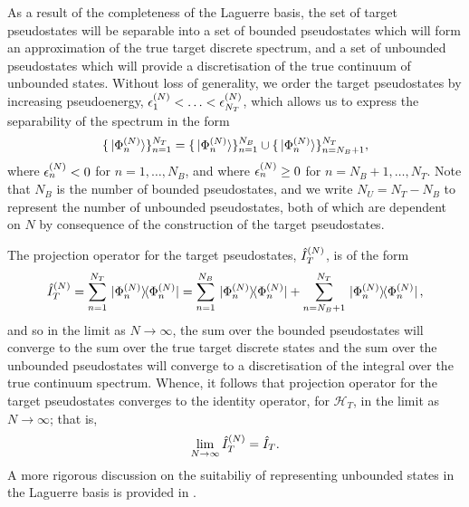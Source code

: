 \documentclass[]{article}
\begin{document}
As a result of the completeness of the Laguerre basis, the set of target
pseudostates will be separable into a set of bounded pseudostates which will
form an approximation of the true target discrete spectrum, and a set of
unbounded pseudostates which will provide a discretisation of the true continuum
of unbounded states.
Without loss of generality, we order the target pseudostates by increasing
pseudoenergy, $\epsilon_{1}^{(N)} < \dotsc < \epsilon_{N_{T}}^{(N)}$,
which allows us to express the separability of the spectrum in the form
\begin{equation}
  \label{eq:target-spectrum-separable}
  \lbrace\ket*{\Phi_{n}^{(N)}}\rbrace_{n = 1}^{N_{T}}
  =
  \lbrace\ket*{\Phi_{n}^{(N)}}\rbrace_{n = 1}^{N_{B}}
  \cup
  \lbrace\ket*{\Phi_{n}^{(N)}}\rbrace_{n = N_{B} + 1}^{N_{T}}
  ,
\end{equation}
where $\epsilon_{n}^{(N)} < 0$ for $n = 1, \dotsc, N_{B}$, and where
$\epsilon_{n}^{(N)} \geq 0$ for $n = N_{B} + 1, \dotsc, N_{T}$.
Note that $N_{B}$ is the number of bounded pseudostates, and we write
$N_{U} = N_{T} - N_{B}$ to represent the number of unbounded pseudostates, both of
which are dependent on $N$ by consequence of the construction of the target
pseudostates.

The projection operator for the target pseudostates, $\hat{I}_{T}^{(N)}$, is
of the form
\begin{equation}
  \label{eq:target-projection}
  \hat{I}_{T}^{(N)}
  =
  \sum_{n = 1}^{N_{T}}
  \ketbra*
  {\Phi_{n}^{(N)}}
  {\Phi_{n}^{(N)}}
  =
  \sum_{n = 1}^{N_{B}}
  \ketbra*
  {\Phi_{n}^{(N)}}
  {\Phi_{n}^{(N)}}
  +
  \sum_{n = N_{B} + 1}^{N_{T}}
  \ketbra*
  {\Phi_{n}^{(N)}}
  {\Phi_{n}^{(N)}}
  ,
\end{equation}
and so in the limit as $N \to \infty$, the sum over the bounded pseudostates
will converge to the sum over the true target discrete states
and the sum over the unbounded pseudostates will converge to a discretisation of
the integral over the true continuum spectrum.
Whence, it follows that projection operator for the target pseudostates
converges to the identity operator, for $\mathcal{H}_{T}$,
in the limit as $N \to \infty$; that is,
\begin{equation}
  \label{eq:target-projection-convergence}
  \lim_{N \to \infty}
  \hat{I}_{T}^{(N)}
  =
  \hat{I}_{T}
  .
\end{equation}
A more rigorous discussion on the suitabiliy of representing unbounded states in
the Laguerre basis is provided in \cite[5-9]{BRAY19951}.
\end{document}
